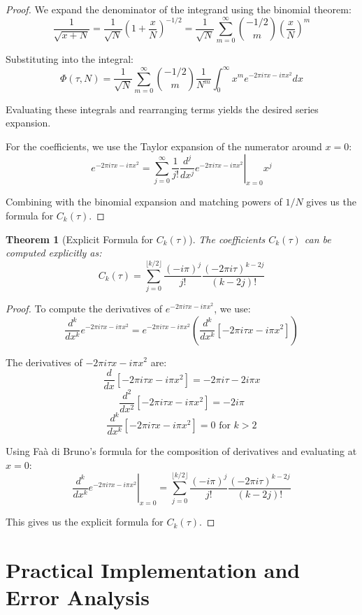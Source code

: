 \documentclass{article}
\newtheorem{theorem}{Theorem}
\begin{document}
\begin{proof}
We expand the denominator of the integrand using the binomial theorem:
\[
\frac{1}{\sqrt{x+N}} = \frac{1}{\sqrt{N}}\left(1 + \frac{x}{N}\right)^{-1/2} = \frac{1}{\sqrt{N}}\sum_{m=0}^{\infty}\binom{-1/2}{m}\left(\frac{x}{N}\right)^m
\]

Substituting into the integral:
\[
\Phi(\tau, N) = \frac{1}{\sqrt{N}}\sum_{m=0}^{\infty}\binom{-1/2}{m}\frac{1}{N^m}\int_0^{\infty}x^m e^{-2\pi i\tau x - i\pi x^2}dx
\]

Evaluating these integrals and rearranging terms yields the desired series expansion.

For the coefficients, we use the Taylor expansion of the numerator around $x=0$:
\[
e^{-2\pi i\tau x - i\pi x^2} = \sum_{j=0}^{\infty}\frac{1}{j!}\left.\frac{d^j}{dx^j}e^{-2\pi i\tau x - i\pi x^2}\right|_{x=0}x^j
\]

Combining with the binomial expansion and matching powers of $1/N$ gives us the formula for $C_k(\tau)$.
\end{proof}

\begin{theorem}[Explicit Formula for $C_k(\tau)$]
The coefficients $C_k(\tau)$ can be computed explicitly as:
\[
C_k(\tau) = \sum_{j=0}^{\lfloor k/2 \rfloor}\frac{(-i\pi)^j}{j!}\frac{(-2\pi i\tau)^{k-2j}}{(k-2j)!}
\]
\end{theorem}

\begin{proof}
To compute the derivatives of $e^{-2\pi i\tau x - i\pi x^2}$, we use:
\[
\frac{d^k}{dx^k}e^{-2\pi i\tau x - i\pi x^2} = e^{-2\pi i\tau x - i\pi x^2}\left(\frac{d^k}{dx^k}[-2\pi i\tau x - i\pi x^2]\right)
\]

The derivatives of $-2\pi i\tau x - i\pi x^2$ are:
\[
\frac{d}{dx}[-2\pi i\tau x - i\pi x^2] = -2\pi i\tau - 2i\pi x
\]
\[
\frac{d^2}{dx^2}[-2\pi i\tau x - i\pi x^2] = -2i\pi
\]
\[
\frac{d^k}{dx^k}[-2\pi i\tau x - i\pi x^2] = 0 \text{ for } k > 2
\]

Using Faà di Bruno's formula for the composition of derivatives and evaluating at $x=0$:
\[
\left.\frac{d^k}{dx^k}e^{-2\pi i\tau x - i\pi x^2}\right|_{x=0} = \sum_{j=0}^{\lfloor k/2 \rfloor}\frac{(-i\pi)^j}{j!}\frac{(-2\pi i\tau)^{k-2j}}{(k-2j)!}
\]

This gives us the explicit formula for $C_k(\tau)$.
\end{proof}

\section{Practical Implementation and Error Analysis}
\end{document}
